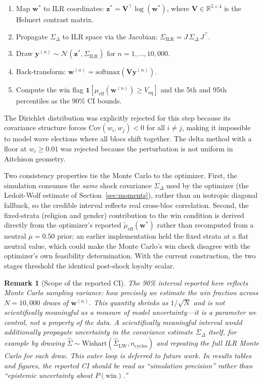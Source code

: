 \documentclass[12pt, letterpaper]{article}
\newtheorem{remark}{Remark}
\theoremstyle{definition}
\newcommand{\mueff}{\mu_{\mathrm{eff}}}
\newcommand{\Veq}{V_{\mathrm{eq}}}
\newcommand{\SigmaDelta}{\Sigma_{\Delta}}
\newcommand{\boldw}{\mathbf{w}}
\begin{document}
\begin{enumerate}
  \item Map $\boldw^*$ to ILR coordinates: $\mathbf{z}^* = \mathbf{V}^\top
        \log(\boldw^*)$, where $\mathbf{V} \in \mathbb{R}^{5\times4}$ is the
        Helmert contrast matrix.
  \item Propagate $\SigmaDelta$ to ILR space via the Jacobian:
        $\Sigma_{\mathrm{ILR}} = J\, \SigmaDelta\, J^\top$.
  \item Draw $\mathbf{y}^{(n)} \sim \mathcal{N}(\mathbf{z}^*, \Sigma_{\mathrm{ILR}})$
        for $n = 1, \ldots, 10{,}000$.
  \item Back-transform: $\boldw^{(n)} = \mathrm{softmax}(\mathbf{V}\mathbf{y}^{(n)})$.
  \item Compute the win flag $\mathbf{1}[\mueff(\boldw^{(n)}) \geq \Veq]$ and
        the 5th and 95th percentiles as the 90\% CI bounds.
\end{enumerate}

The Dirichlet distribution was explicitly rejected for this step because its
covariance structure forces $\mathrm{Cov}(w_i, w_j) < 0$ for all $i \neq j$,
making it impossible to model wave elections where all blocs shift together.
The delta method with a floor at $w_i \geq 0.01$ was rejected because the
perturbation is not uniform in Aitchison geometry.

Two consistency properties tie the Monte Carlo to the optimizer. First, the
simulation consumes the \emph{same} shock covariance $\SigmaDelta$ used by the
optimizer (the Ledoit-Wolf estimate of Section~\ref{sec:moments}), rather than
an isotropic diagonal fallback, so the credible interval reflects real
cross-bloc correlation. Second, the fixed-strata (religion and gender)
contribution to the win condition is derived directly from the optimizer's
reported $\tilde{\mu}_{\mathrm{eff}}(\boldw^*)$ rather than recomputed from a
neutral $\mu = 0.50$ prior; an earlier implementation held the fixed strata at
a flat neutral value, which could make the Monte Carlo's win check disagree
with the optimizer's own feasibility determination. With the current
construction, the two stages threshold the identical post-shock loyalty scalar.

\begin{remark}[Scope of the reported CI]
The 90\% interval reported here reflects \emph{Monte Carlo sampling variance}:
how precisely we estimate the win fraction across $N = 10{,}000$ draws of
$\boldw^{(n)}$. This quantity shrinks as $1/\sqrt{N}$ and is not scientifically
meaningful as a measure of model uncertainty---it is a parameter we control, not
a property of the data. A scientifically meaningful interval would additionally
propagate uncertainty in the covariance estimate $\SigmaDelta$ itself, for
example by drawing $\hat{\Sigma} \sim \mathrm{Wishart}(\hat{\Sigma}_{\mathrm{LW}},
n_{\mathrm{cycles}})$ and repeating the full ILR Monte Carlo for each draw.
This outer loop is deferred to future work. In results tables and figures, the
reported CI should be read as ``simulation precision'' rather than
``epistemic uncertainty about $P(\text{win})$.''
\end{remark}
\end{document}
